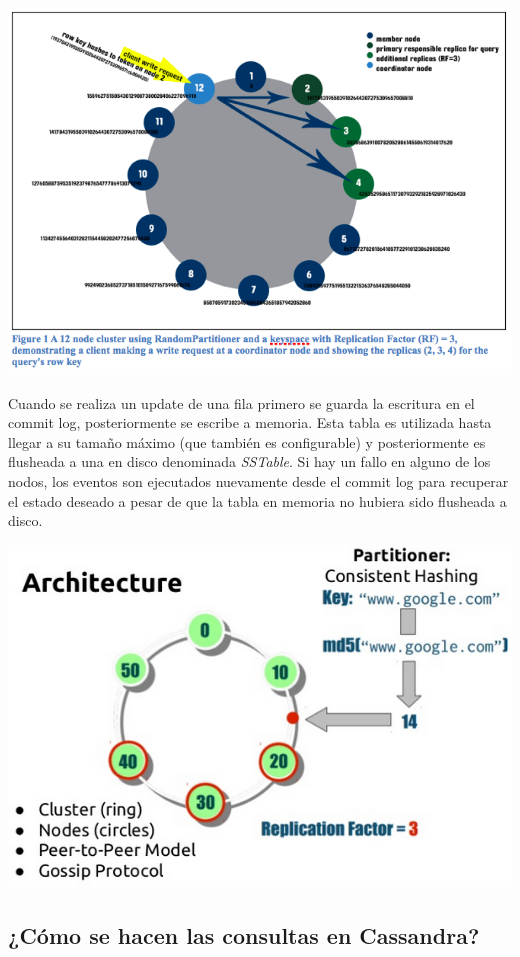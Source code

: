 \documentclass[11pt,a4paper]{article}
\begin{document}
\centerline{\includegraphics[scale=0.5]{imagenes/cassandra-ring}}

Cuando se realiza un update de una fila primero se guarda la escritura en el commit log, posteriormente se escribe a memoria. Esta tabla es utilizada hasta llegar a su tamaño máximo (que también es configurable) y posteriormente es flusheada a una en disco denominada \textit{SSTable}. Si hay un fallo en alguno de los nodos, los eventos son ejecutados nuevamente desde el commit log para recuperar el estado deseado a pesar de que la tabla en memoria no hubiera sido flusheada a disco. \\

\centerline{\includegraphics[scale=0.5]{imagenes/cassandra-ring-2}}

\subsection{¿Cómo se hacen las consultas en Cassandra?}
\end{document}
